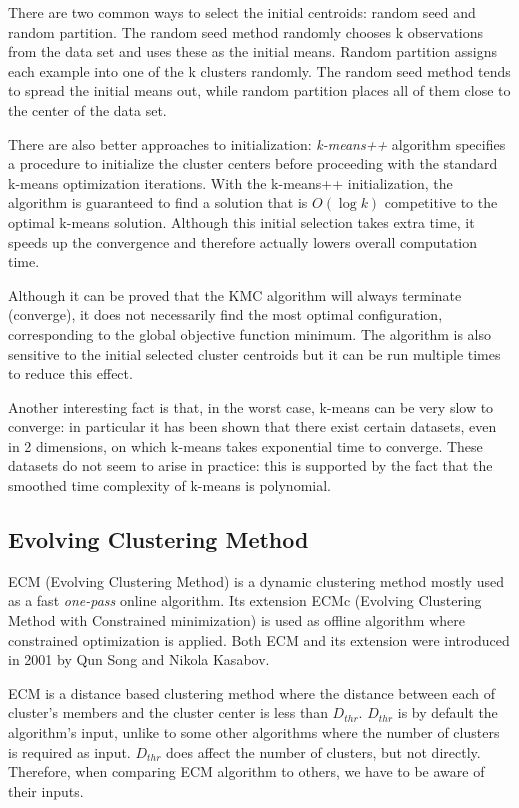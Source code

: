 \documentclass[conference]{IEEEtran}
\begin{document}
There are two common ways to select the initial centroids: random seed and random partition.
The random seed method randomly chooses k observations from the data set
and uses these as the initial means. Random partition
assigns each example into one of the k clusters randomly.
The random seed method tends to spread the initial means out, while random partition
places all of them close to the center of the data set.

There are also better approaches to initialization: \textit{k-means++} algorithm specifies a
procedure to initialize the cluster centers before proceeding with the standard k-means
optimization iterations. With the k-means++ initialization, the algorithm is guaranteed
to find a solution that is $O(\log k)$ competitive to the optimal k-means solution.
Although this initial selection takes extra time, it speeds up the convergence and 
therefore actually lowers overall computation time.

Although it can be proved that the KMC algorithm will always terminate (converge),
it does not necessarily find the most optimal configuration,
corresponding to the global objective function minimum. The algorithm is also sensitive
to the initial selected cluster centroids but it can be run multiple times to reduce this effect.

Another interesting fact is that, in the worst case, k-means can be very slow to converge:
in particular it has been shown that there exist certain datasets,
even in 2 dimensions, on which k-means takes exponential time to converge.
These datasets do not seem to arise in practice: this is supported by the
fact that the smoothed time complexity of k-means is polynomial.


\subsection{Evolving Clustering Method}

ECM (Evolving Clustering Method) is a dynamic clustering method mostly used as a fast \textit{one-pass} online algorithm. %
Its extension ECMc (Evolving Clustering Method with Constrained minimization) is used as offline algorithm where constrained optimization
is applied. Both ECM and its extension were introduced in 2001 by Qun Song and Nikola Kasabov.

ECM is a distance based clustering method where the distance between each of cluster's members and the cluster center is less than $D_{thr}$.%
$D_{thr}$ is by default the algorithm's input, unlike to some other algorithms where the number of clusters is required as
input. $D_{thr}$ does affect the number of clusters, but not directly. Therefore, when comparing ECM algorithm to
others, we have to be aware of their inputs.
\end{document}
